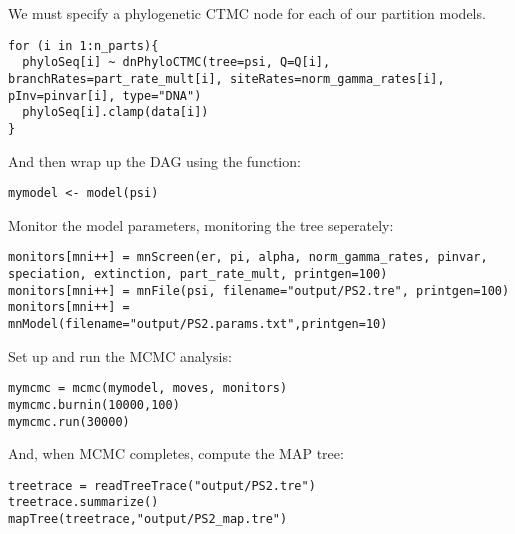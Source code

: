We must specify a phylogenetic CTMC node for each of our partition models.
{\tt \begin{snugshade*}
\begin{lstlisting}
for (i in 1:n_parts){
  phyloSeq[i] ~ dnPhyloCTMC(tree=psi, Q=Q[i], branchRates=part_rate_mult[i], siteRates=norm_gamma_rates[i], pInv=pinvar[i], type="DNA")
  phyloSeq[i].clamp(data[i])
}

\end{lstlisting}
\end{snugshade*}}

And then wrap up the DAG using the  function:
{\tt \begin{snugshade*}
\begin{lstlisting}
mymodel <- model(psi)
\end{lstlisting}
\end{snugshade*}}

Monitor the model parameters, monitoring the tree seperately:

{\tt \begin{snugshade*}
\begin{lstlisting}
monitors[mni++] = mnScreen(er, pi, alpha, norm_gamma_rates, pinvar, speciation, extinction, part_rate_mult, printgen=100)
monitors[mni++] = mnFile(psi, filename="output/PS2.tre", printgen=100)
monitors[mni++] = mnModel(filename="output/PS2.params.txt",printgen=10)
\end{lstlisting}
\end{snugshade*}}

Set up and run the MCMC analysis:

{\tt \begin{snugshade*}
\begin{lstlisting}
mymcmc = mcmc(mymodel, moves, monitors)
mymcmc.burnin(10000,100)
mymcmc.run(30000)
\end{lstlisting}
\end{snugshade*}}

And, when MCMC completes, compute the MAP tree:

{\tt \begin{snugshade*}
\begin{lstlisting}
treetrace = readTreeTrace("output/PS2.tre")
treetrace.summarize()
mapTree(treetrace,"output/PS2_map.tre")
\end{lstlisting}
\end{snugshade*}}

